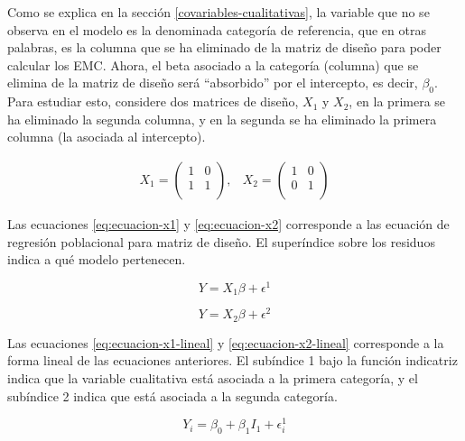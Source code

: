 \documentclass[
  11pt,
]{book}
\theoremstyle{definition}
\theoremstyle{definition}
\theoremstyle{definition}
\theoremstyle{definition}
\theoremstyle{remark}
\begin{document}
Como se explica en la sección \ref{covariables-cualitativas}, la variable que no se observa en el modelo es la denominada categoría de referencia, que en otras palabras, es la columna que se ha eliminado de la matriz de diseño para poder calcular los EMC. Ahora, el beta asociado a la categoría (columna) que se elimina de la matriz de diseño será ``absorbido'' por el intercepto, es decir, \(\beta_0\). Para estudiar esto, considere dos matrices de diseño, \(X_1\) y \(X_2\), en la primera se ha eliminado la segunda columna, y en la segunda se ha eliminado la primera columna (la asociada al intercepto).

\begin{equation}
\begin{matrix}
X_1 = \begin{pmatrix}
1 & 0 \\
1 & 1 \\
\end{pmatrix},
&
X_2 = \begin{pmatrix}
1 & 0 \\
0 & 1 \\
\end{pmatrix}
\end{matrix}
\label{eq:matriz-corregidas}
\end{equation}

Las ecuaciones \eqref{eq:ecuacion-x1} y \eqref{eq:ecuacion-x2} corresponde a las ecuación de regresión poblacional para matriz de diseño. El superíndice sobre los residuos indica a qué modelo pertenecen.

\begin{equation}
Y = X_1\beta + \epsilon^1
\label{eq:ecuacion-x1}
\end{equation}

\begin{equation}
Y = X_2\beta + \epsilon^2 
\label{eq:ecuacion-x2}
\end{equation}

Las ecuaciones \eqref{eq:ecuacion-x1-lineal} y \eqref{eq:ecuacion-x2-lineal} corresponde a la forma lineal de las ecuaciones anteriores. El subíndice 1 bajo la función indicatriz indica que la variable cualitativa está asociada a la primera categoría, y el subíndice 2 indica que está asociada a la segunda categoría.

\begin{equation}
Y_i = \beta_0 + \beta_1I_1 + \epsilon_i^1
\label{eq:ecuacion-x1-lineal}
\end{equation}
\end{document}
